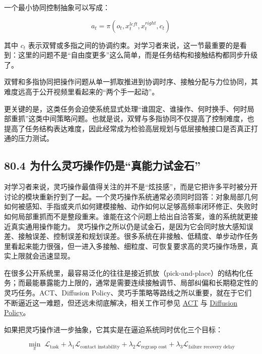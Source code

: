 一个最小协同控制抽象可以写成：

\begin{equation*}
a_t = \pi(o_t, x_t^{left}, x_t^{right}, c_t)
\end{equation*}

其中 \(c_t\) 表示双臂或多指之间的协调约束。对学习者来说，这一节最重要的是看到：这里的问题不是“自由度更多”这么简单，而是任务结构和接触结构都同步升级了。

双臂和多指协同把操作问题从单一抓取推进到协调时序、接触分配与力位协同，其难度远高于公开视频里看起来的“两个手一起动”。

更关键的是，这类任务会迫使系统显式处理“谁固定、谁操作、何时换手、何时局部重抓”这类中间策略问题。也就是说，双臂与多指协同不仅提高了控制难度，也提高了任务结构表达难度，因此经常成为检验高层规划与低层接触接口是否真正打通的压力测试。

\subsection*{80.4 为什么灵巧操作仍是“真能力试金石”}


对学习者来说，灵巧操作最值得关注的并不是“炫技感”，而是它把许多平时被分开讨论的模块重新拧到了一起。一个灵巧操作系统通常必须同时回答：对象局部几何如何被感知、手指或夹爪如何建模接触、动作如何以足够高频率闭环修正、失败时如何局部重抓而不是整段重来。谁能在这个问题上给出自洽答案，谁的系统就更接近真实通用操作能力。 灵巧操作之所以仍是试金石，是因为它会同时放大感知误差、接触误差、控制误差和规划误差。很多系统在非接触、低精度、单步动作任务里看起来能力很强，但一进入多接触、细粒度、可恢复要求高的灵巧操作场景，真实上限就会迅速显现。

在很多公开系统里，最容易泛化的往往是接近抓放（pick-and-place）的结构化任务；而最能暴露能力上限的，通常是需要连续接触调节、局部纠偏和长期稳定性的灵巧任务。ACT、Diffusion Policy、灵巧手策略等路线之所以重要，就在于它们不断逼近这一难题，但还远未彻底解决，相关工作可参见 \href{https://arxiv.org/abs/2304.13705}{ACT} 与 \href{https://arxiv.org/abs/2303.04137}{Diffusion Policy}。

如果把灵巧操作进一步抽象，它其实是在逼迫系统同时优化三个目标：

\begingroup
\scriptsize
\begin{equation*}
\min_{\pi} \; \mathcal{L}_{\text{task}}
+ \lambda_1 \mathcal{L}_{\text{contact instability}}
+ \lambda_2 \mathcal{L}_{\text{regrasp cost}}
+ \lambda_3 \mathcal{L}_{\text{failure recovery delay}}
\end{equation*}
\endgroup

